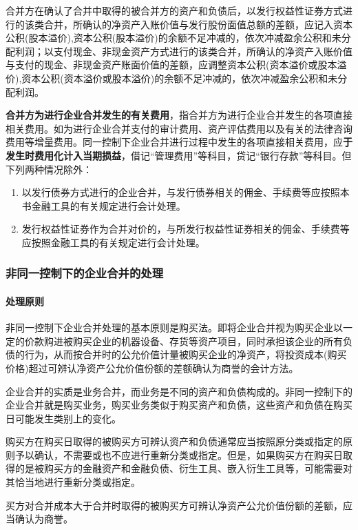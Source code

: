\documentclass[UTF8,12pt]{ctexart}
\numberwithin{equation}{section} %
\numberwithin{figure}{section}
\numberwithin{table}{section}
\begin{document}
	合并方在确认了合并中取得的被合并方的资产和负债后，以发行权益性证券方式进行的该类合并，所确认的净资产入账价值与发行股份面值总额的差额，应记入资本公积(股本溢价),资本公积(股本溢价)的余额不足冲减的，依次冲减盈余公积和未分配利润；以支付现金、非现金资产方式进行的该类合并，所确认的净资产入账价值与支付的现金、非现金资产账面价值的差额，应调整资本公积(资本溢价或股本溢价),资本公积(资本溢价或股本溢价)的余额不足冲减的，依次冲减盈余公积和未分配利润。
	
	\textbf{合并方为进行企业合并发生的有关费用}，指合并方为进行企业合并发生的各项直接相关费用。如为进行企业合并支付的审计费用、资产评估费用以及有关的法律咨询费用等增量费用。同一控制下企业合并进行过程中发生的各项直接相关费用，应\textbf{于发生时费用化计入当期损益}，借记“管理费用”等科目，贷记“银行存款”等科目。但下列两种情况除外：
	\begin{enumerate}
		\item 以发行债券方式进行的企业合并，与发行债券相关的佣金、手续费等应按照本书金融工具的有关规定进行会计处理。
		
		\item 发行权益性证券作为合并对价的，与所发行权益性证券相关的佣金、手续费等应按照金融工具的有关规定进行会计处理。
	\end{enumerate}
	
	\subsubsection{非同一控制下的企业合并的处理}
	\paragraph{处理原则}
	非同一控制下企业合并处理的基本原则是购买法。即将企业合并视为购买企业以一定的价款购进被购买企业的机器设备、存货等资产项目，同时承担该企业的所有负债的行为，从而按合并时的公允价值计量被购买企业的净资产，将投资成本(购买价格)超过可辨认净资产公允价值份额的差额确认为商誉的会计方法。
	
	企业合并的实质是业务合并，而业务是不同的资产和负债构成的。非同一控制下的企业合并就是购买业务，购买业务类似于购买资产和负债，这些资产和负债在购买日可能发生类别上的变化。
	
	购买方在购买日取得的被购买方可辨认资产和负债通常应当按照原分类或指定的原则予以确认，不需要或也不应进行重新分类或指定。但是，如果购买方在购买日取得的是被购买方的金融资产和金融负债、衍生工具、嵌入衍生工具等，可能需要对其恰当地进行重新分类或指定。
	
	买方对合并成本大于合并时取得的被购买方可辨认净资产公允价值份额的差额，应当确认为商誉。
	
\end{document}
